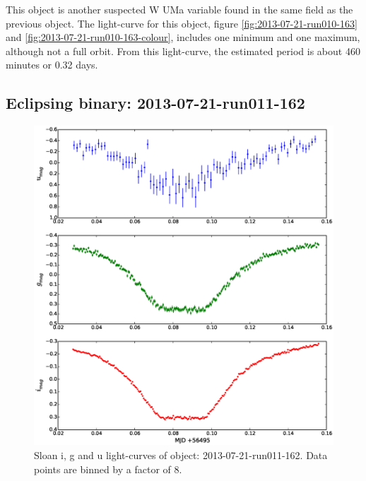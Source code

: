 This object is another suspected {W UMa} variable found in the same field as the previous object. The light-curve for this object, figure \ref{fig:2013-07-21-run010-163} and \ref{fig:2013-07-21-run010-163-colour}, includes one minimum and one maximum, although not a full orbit. From this light-curve, the estimated period is about 460 minutes or 0.32 days.

\subsection{Eclipsing binary: 2013-07-21-run011-162}
  
\begin{figure}
  \center
  \includegraphics[width=120mm]{images/2013-07-21-run011-162_lightcurve-bin8.eps}
  \caption{Sloan i, g and u light-curves of object: 2013-07-21-run011-162. Data points are binned by a factor of 8.}
  \label{fig:2013-07-21-run011-162}
\end{figure}

